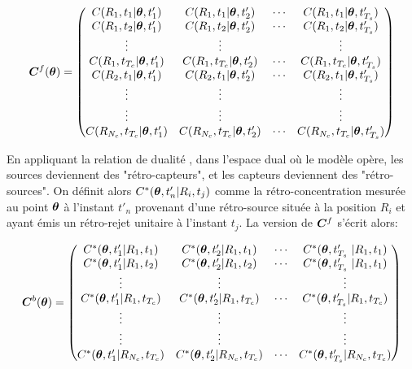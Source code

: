 \begin{equation}
{\bm{C}}^f({\bm{\theta}}) = 
\begin{pmatrix}
C(R_1,t_1 | {\bm{\theta}}, t'_1) & C(R_1,t_1 | {\bm{\theta}}, t'_2) & \cdots & C(R_1, t_1 |{\bm{\theta}}, t'_{T_s}) \\
C(R_1,t_2 | {\bm{\theta}}, t'_1) & C(R_1,t_2 | {\bm{\theta}}, t'_2) & \cdots & C(R_1, t_2 |{\bm{\theta}}, t'_{T_s}) \\
\vdots & \vdots & & \vdots \\
C(R_1,t_{T_c} | {\bm{\theta}}, t'_1) & C(R_1,t_{T_c} | {\bm{\theta}}, t'_2) & \cdots & C(R_1, t_{T_c} |{\bm{\theta}}, t'_{T_s}) \\
C(R_2,t_1| {\bm{\theta}}, t'_1) & C(R_2,t_1 | {\bm{\theta}}, t'_2) & \cdots & C(R_2, t_1 |{\bm{\theta}}, t'_{T_s}) \\
\vdots & \vdots & & \vdots \\
\vdots & \vdots & & \vdots \\
C(R_{N_c},t_{T_c} | {\bm{\theta}}, t'_1) & C(R_{N_c},t_{T_c} | {\bm{\theta}}, t'_2) & \cdots & C(R_{N_c}, t_{T_c} |{\bm{\theta}}, t'_{T_s}) \\
\end{pmatrix}
\label{eq_matrix_forward}
\end{equation}

En appliquant la relation de dualité , dans l'espace dual où le modèle  opère, les sources deviennent des "rétro-capteurs", et les capteurs deviennent des "rétro-sources". On définit alors $C^*({\bm{\theta}},t'_n | R_i, t_j)$ comme la rétro-concentration mesurée au point ${\bm{\theta}}$ à l'instant $t'_n$ provenant d'une rétro-source située à la position $R_i$ et ayant émis un rétro-rejet unitaire à l'instant $t_j$. La version  de ${\bm{C}}^f$ s'écrit alors:

\begin{equation}
\MatC^b (\VecTheta)= 
\begin{pmatrix}
	C^*(\VecTheta, t'_1 | R_1, t_1) & C^*(\VecTheta, t'_2 | R_1, t_1) & \cdots & C^*(\VecTheta, t'_{T_s} | R_1, t_1) \\
	C^*(\VecTheta, t'_1 | R_1, t_2) & C^*(\VecTheta, t'_2 | R_1, t_2) & \cdots & C^*(\VecTheta, t'_{T_s} | R_1, t_1) \\
	\vdots & \vdots & & \vdots \\
	C^*(\VecTheta, t'_1| R_1,t_{T_c}) & C^*(\VecTheta, t'_2 | R_1, t_{T_c}) & \cdots & C^*(\VecTheta, t'_{T_s} | R_1, t_{T_c}) \\ 
	\vdots & \vdots & & \vdots \\
	\vdots & \vdots & & \vdots \\
	C^*(\VecTheta, t'_1| R_{N_c},t_{T_c}) & C^*(\VecTheta, t'_2 | R_{N_c}, t_{T_c}) & \cdots & C^*(\VecTheta, t'_{T_s} | R_{N_c}, t_{T_c}) \\ 
	
\end{pmatrix}
\label{eq_matrix_backward}
\end{equation}

